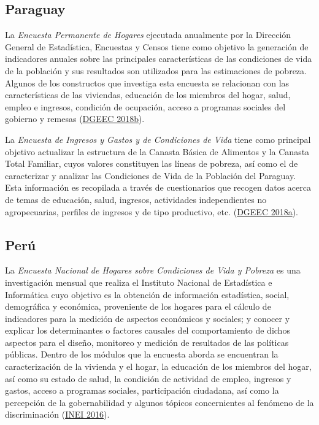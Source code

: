 \documentclass[
  12pt,
  spanish,
]{book}
\begin{document}
\hypertarget{paraguay}{%
\subsection*{Paraguay}\label{paraguay}}

La \emph{Encuesta Permanente de Hogares} ejecutada anualmente por la Dirección General de Estadística, Encuestas y Censos tiene como objetivo la generación de indicadores anuales sobre las principales características de las condiciones de vida de la población y sus resultados son utilizados para las estimaciones de pobreza. Algunos de los constructos que investiga esta encuesta se relacionan con las características de las viviendas, educación de los miembros del hogar, salud, empleo e ingresos, condición de ocupación, acceso a programas sociales del gobierno y remesas (\protect\hyperlink{ref-DGEEC-PY}{DGEEC 2018b}).

La \emph{Encuesta de Ingresos y Gastos y de Condiciones de Vida} tiene como principal objetivo actualizar la estructura de la Canasta Básica de Alimentos y la Canasta Total Familiar, cuyos valores constituyen las líneas de pobreza, así como el de caracterizar y analizar las Condiciones de Vida de la Población del Paraguay. Esta información es recopilada a través de cuestionarios que recogen datos acerca de temas de educación, salud, ingresos, actividades independientes no agropecuarias, perfiles de ingresos y de tipo productivo, etc. (\protect\hyperlink{ref-DGEEC2-PY}{DGEEC 2018a}).

\hypertarget{peruxfa}{%
\subsection*{Perú}\label{peruxfa}}

La \emph{Encuesta Nacional de Hogares sobre Condiciones de Vida y Pobreza} es una investigación mensual que realiza el Instituto Nacional de Estadística e Informática cuyo objetivo es la obtención de información estadística, social, demográfica y económica, proveniente de los hogares para el cálculo de indicadores para la medición de aspectos económicos y sociales; y conocer y explicar los determinantes o factores causales del comportamiento de dichos aspectos para el diseño, monitoreo y medición de resultados de las políticas públicas. Dentro de los módulos que la encuesta aborda se encuentran la caracterización de la vivienda y el hogar, la educación de los miembros del hogar, así como su estado de salud, la condición de actividad de empleo, ingresos y gastos, acceso a programas sociales, participación ciudadana, así como la percepción de la gobernabilidad y algunos tópicos concernientes al fenómeno de la discriminación (\protect\hyperlink{ref-INEI-PE_2016}{INEI 2016}).
\end{document}
